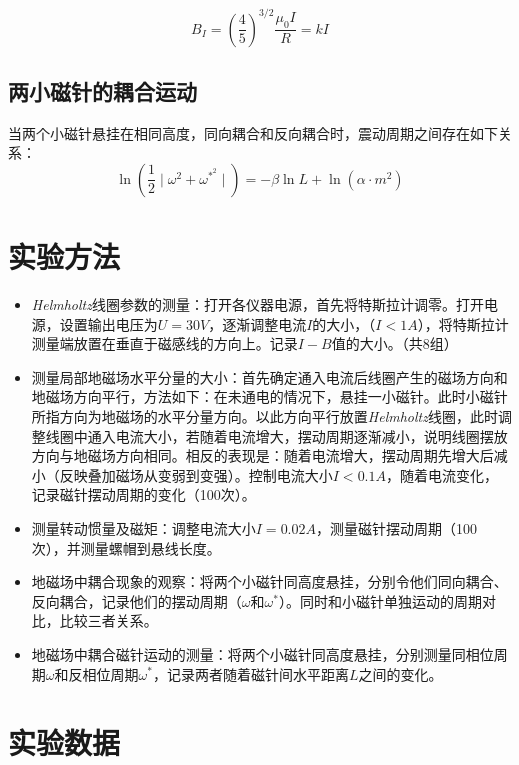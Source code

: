 \documentclass[a4paper]{ltxdoc}
\begin{document}
\begin{multicols}{2}
    \begin{equation}
        B_I = (\dfrac{4}{5})^{3/2} \dfrac{\mu_0 I}{R} = kI
    \end{equation}

    \subsection{两小磁针的耦合运动}
    当两个小磁针悬挂在相同高度，同向耦合和反向耦合时，震动周期之间存在如下关系：
    \begin{equation}
        \ln (\dfrac 1 2 \mid \omega^2 + \omega^{*^2} \mid) = -\beta \ln L + \ln (\alpha\cdot m^2)
    \end{equation}

    \section{实验方法}

    \begin{itemize}
        \item \textit{Helmholtz}线圈参数的测量：打开各仪器电源，首先将特斯拉计调零。打开电源，设置输出电压为$U=30V$，逐渐调整电流$I$的大小，（$I<1A$），将特斯拉计测量端放置在垂直于磁感线的方向上。记录$I-B$值的大小。（共8组）
        \item 测量局部地磁场水平分量的大小：首先确定通入电流后线圈产生的磁场方向和地磁场方向平行，方法如下：在未通电的情况下，悬挂一小磁针。此时小磁针所指方向为地磁场的水平分量方向。以此方向平行放置\textit{Helmholtz}线圈，此时调整线圈中通入电流大小，若随着电流增大，摆动周期逐渐减小，说明线圈摆放方向与地磁场方向相同。相反的表现是：随着电流增大，摆动周期先增大后减小（反映叠加磁场从变弱到变强）。控制电流大小$I<0.1A$，随着电流变化，记录磁针摆动周期的变化（100次）。
        \item 测量转动惯量及磁矩：调整电流大小$I=0.02A$，测量磁针摆动周期（100次），并测量螺帽到悬线长度。
        \item 地磁场中耦合现象的观察：将两个小磁针同高度悬挂，分别令他们同向耦合、反向耦合，记录他们的摆动周期（$\omega$和$\omega^{*}$）。同时和小磁针单独运动的周期对比，比较三者关系。
        \item 地磁场中耦合磁针运动的测量：将两个小磁针同高度悬挂，分别测量同相位周期$\omega$和反相位周期$\omega^{*}$，记录两者随着磁针间水平距离$L$之间的变化。
    \end{itemize}

    \section{实验数据}

\end{multicols}
\end{document}
